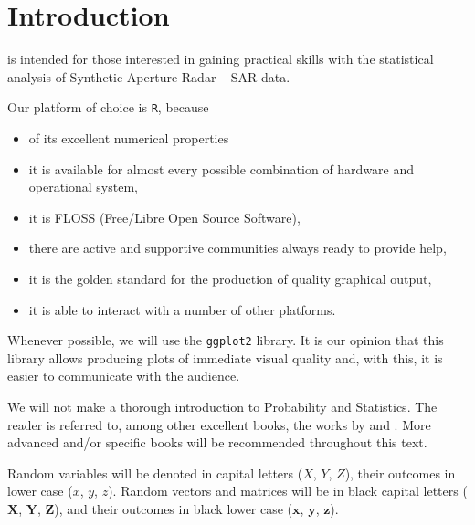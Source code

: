 \chapter{Introduction}\label{Chapter:Introduction}

 is intended for those interested in gaining practical skills with the statistical analysis of Synthetic Aperture Radar -- SAR data.

Our platform of choice is \texttt R, because
\begin{itemize}
\item of its excellent numerical properties\cite{AlmironSilvaMM:2009}%
\cite{OctaveScilabMatlabCAM}
\item it is available for almost every possible combination of hardware and operational system,
\item it is FLOSS (Free/Libre Open Source Software),
\item there are active and supportive communities always ready to provide help,
\item it is the golden standard for the production of quality graphical output,
\item it is able to interact with a number of other platforms.
\end{itemize}

Whenever possible, we will use the \texttt{ggplot2} library\cite{HitchhikerGuideGGPLO2,ggplot2Wickman}.
It is our opinion that this library allows producing plots of immediate visual quality and, with this, it is easier to communicate with the audience.

We will not make a thorough introduction to Probability and Statistics.
The reader is referred to, among other excellent books, the works by
\citet{BickelDocksum77} and
\citet{ModernIntroProbStat:Dekkingetal:2005}.
More advanced and/or specific books will be recommended throughout this text.


Random variables will be denoted in capital letters ($X$, $Y$, $Z$),
their outcomes in lower case ($x$, $y$, $z$).
Random vectors and matrices will be in black capital letters ($\bm X$, $\bm Y$, $\bm Z$), and their outcomes in black lower case ($\bm x$, $\bm y$, $\bm z$).


